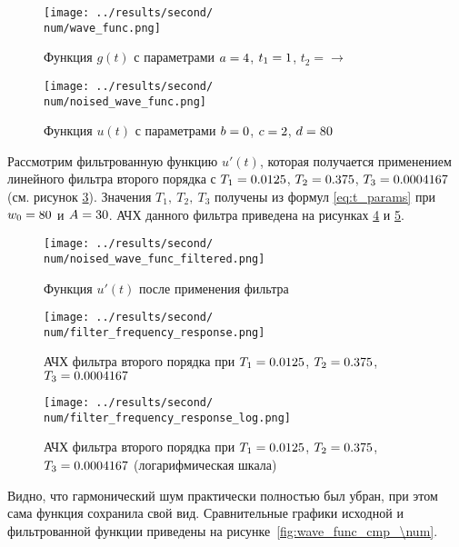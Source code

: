 \begin{figure}[ht!]
    \centering
    \texttt{[image: ../results/second/\\num/wave\_func.png]}
    \caption{Функция $g(t)$ с параметрами $a = 4$, $t_1 = 1$, $t_2 = \to$}
    \label{fig:wave_func_\num}
\end{figure}

\begin{figure}[ht!]
    \centering
    \texttt{[image: ../results/second/\\num/noised\_wave\_func.png]}
    \caption{Функция $u(t)$ с параметрами $b = 0$, $c = 2$, $d = 80$}
    \label{fig:noised_wave_func_\num}
\end{figure}

Рассмотрим фильтрованную функцию $u'(t)$, которая получается применением линейного фильтра второго порядка с $T_1 = \Tf$, $T_2 = \Ts$, $T_3 = \Tt$ (см. рисунок \ref{fig:noised_wave_func_filtered_\num}).
Значения $T_1,~T_2,~T_3$ получены из формул \eqref{eq:t_params} при $w_0 = 80$ и $A = 30$.
АЧХ данного фильтра приведена на рисунках \ref{fig:filter_frequency_response_\num} и \ref{fig:filter_frequency_response_log_\num}.

\begin{figure}[ht!]
    \centering
    \texttt{[image: ../results/second/\\num/noised\_wave\_func\_filtered.png]}
    \caption{Функция $u'(t)$ после применения фильтра}
    \label{fig:noised_wave_func_filtered_\num}
\end{figure}

\begin{figure}[ht!]
    \centering
    \texttt{[image: ../results/second/\\num/filter\_frequency\_response.png]}
    \caption{АЧХ фильтра второго порядка при $T_1 = \Tf$, $T_2 = \Ts$, $T_3 = \Tt$}
    \label{fig:filter_frequency_response_\num}
\end{figure}

\begin{figure}[ht!]
    \centering
    \texttt{[image: ../results/second/\\num/filter\_frequency\_response\_log.png]}
    \caption{АЧХ фильтра второго порядка при $T_1 = \Tf$, $T_2 = \Ts$, $T_3 = \Tt$ (логарифмическая шкала)}
    \label{fig:filter_frequency_response_log_\num}
\end{figure}

Видно, что гармонический шум практически полностью был убран, при этом сама функция сохранила свой вид. 
Сравнительные графики исходной и фильтрованной функции приведены на рисунке~\ref{fig:wave_func_cmp_\num}.

